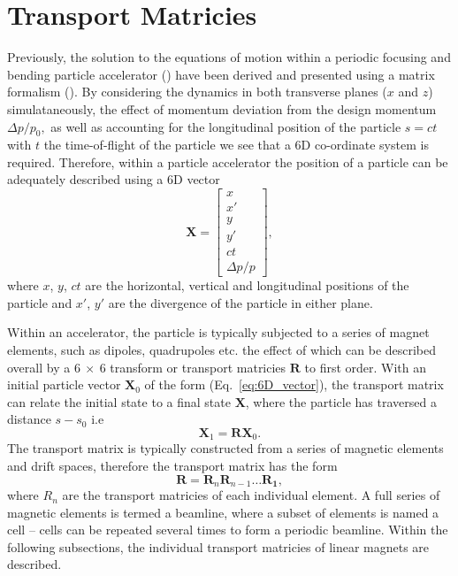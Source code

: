 \documentclass[../main.tex]{subfiles}
\begin{document}
\section{Transport Matricies} 

Previously, the solution to the equations of motion within a periodic focusing and bending particle accelerator () have been derived and presented using a matrix formalism (). By considering the dynamics in both transverse planes ($x$ and $z$) simulataneously, the effect of momentum deviation from the design momentum $\Delta p/p_{0},$ as well as accounting for the longitudinal position of the particle $s=ct$ with $t$ the time-of-flight of the particle we see that a 6D co-ordinate system is required. Therefore, within a particle accelerator the position of a particle can be adequately described using a 6D vector 
\begin{equation}
\boldsymbol{X} = 
\begin{bmatrix}
x \\
x' \\
y \\
y' \\
ct \\
\Delta p/p
\end{bmatrix},
\label{eq:6D_vector}
\end{equation}
where $x$, $y$, $ct$ are the horizontal, vertical and longitudinal positions of the particle and $x'$, $y'$ are the divergence of the particle in either plane.

Within an accelerator, the particle is typically subjected to a series of magnet elements, such as dipoles, quadrupoles etc. the effect of which can be described overall by a $6~\times~6$ transform or transport matricies $\boldsymbol{R}$ to first order. With an initial particle vector $\boldsymbol{X}_{0}$ of the form (Eq.~\ref{eq:6D_vector}), the transport matrix can relate the initial state to a final state $\boldsymbol{X}$, where the particle has traversed a distance $s-s_{0}$ i.e
\begin{equation}
\boldsymbol{X}_{1} = \boldsymbol{R}\boldsymbol{X}_{0}.
\label{eq:overall_transport_matrix}
\end{equation}
The transport matrix is typically constructed from a series of magnetic elements and drift spaces, therefore the transport matrix has the form
\begin{equation}
\boldsymbol{R} = \boldsymbol{R}_{n}\boldsymbol{R}_{n-1}\ldots\boldsymbol{R_{1}},
\label{eq:subseries_transport_matrix}    
\end{equation}
where $R_{n}$ are the transport matricies of each individual element. A full series of magnetic elements is termed a beamline, where a subset of elements is named a cell -- cells can be repeated several times to form a periodic beamline. Within the following subsections, the individual transport matricies of linear magnets are described. 
\end{document}
